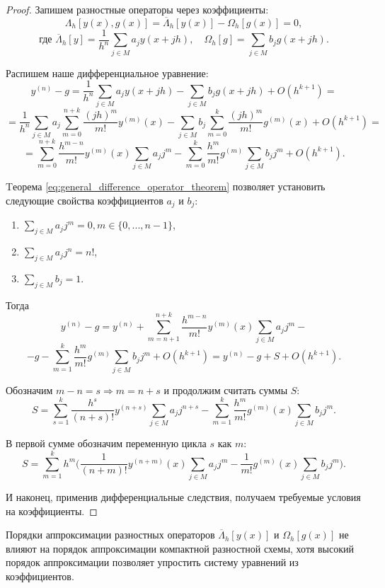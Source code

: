 \documentclass[../main.tex]{subfile}
\begin{document}
\begin{proof}
	Запишем разностные операторы через коэффициенты:
	\[\Lambda_h[y(x),g(x)]=\overline{\Lambda}_h[y(x)]-\Omega_h[g(x)]=0,\]
	\[\text{где }\overline{\Lambda}_h[y]=\frac{1}{h^n}\sum_{j\in M}a_j
	y(x+jh),\quad\Omega_h[g]=\sum_{j\in M}b_jg(x+jh).\]

	Распишем наше дифференциальное уравнение:
	\[y^{(n)}-g=\frac{1}{h^n}\sum_{j\in M}a_jy(x+jh)-\sum_{j\in M}b_j
	g(x+jh)+O(h^{k+1})=\]
	\[=\frac{1}{h^n}\sum_{j\in M}a_j\sum_{m=0}^{n+k} \frac{(jh)^m}{m!}
	y^{(m)}(x)-\sum_{j\in M}b_j\sum_{m=0}^{k}\frac{(jh)^m}{m!}g^{(m)}(x)+
	O(h^{k+1})=\]
	\[=\sum_{m=0}^{n+k}\frac{h^{m-n}}{m!}y^{(m)}(x)\sum_{j\in M}a_jj^m-
	\sum_{m=0}^{k}\frac{h^m}{m!}g^{(m)}\sum_{j\in M}b_jj^m+O(h^{k+1}).\]

	Tеорема \eqref{eq:general_difference_operator_theorem} позволяет
	установить следующие свойства коэффициентов $a_j$ и $b_j$:
	\begin{enumerate}[nosep]
		\item $\sum_{j\in M}a_jj^m=0,m\in\{0,...,n-1\}$,
		\item $\sum_{j\in M}a_jj^n=n!$,
		\item $\sum_{j\in M}b_j=1$.
	\end{enumerate}

	Тогда
	\[y^{(n)}-g=y^{(n)}+\sum_{m=n+1}^{n+k}\frac{h^{m-n}}{m!}y^{(m)}(x)
	\sum_{j\in M}a_jj^m-\]
	\[-g-\sum_{m=1}^{k}\frac{h^m}{m!}g^{(m)}\sum_{j\in M}b_jj^m+O(h^{k+1})=
	y^{(n)}-g+S+O(h^{k+1}).\]

	Обозначим $m-n=s\Rightarrow m=n+s$ и продолжим считать суммы $S$:
	\[S=\sum_{s=1}^{k}\frac{h^s}{(n+s)!}y^{(n+s)}\sum_{j\in M}a_jj^{n+s}-
	\sum_{m=1}^{k}\frac{h^m}{m!}g^{(m)}(x)\sum_{j\in M}b_jj^m.\]

	В первой сумме обозначим переменную цикла $s$ как $m$:
	\[S=\sum_{m=1}^{k}h^m\Big(\frac{1}{(n+m)!}y^{(n+m)}(x)\sum_{j\in M}a_j
	j^m-\frac{1}{m!}g^{(m)}(x)\sum_{j\in M}b_jj^m\Big).\]

	И наконец, применив дифференциальные следствия, получаем требуемые
	условия на коэффициенты.
\end{proof}

\begin{remark}
	Порядки аппроксимации разностных операторов $\overline{\Lambda}_h[y(x)]$
	и $\Omega_h[g(x)]$ не влияют на порядок аппроксимации компактной
	разностной схемы, хотя высокий порядок аппроксимации позволяет упростить
	систему уравнений из коэффициентов.
\end{remark}
\end{document}
